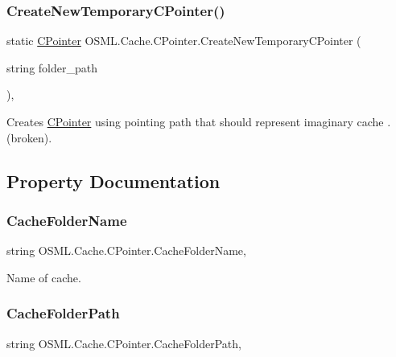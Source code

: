 \subsubsection{\texorpdfstring{CreateNewTemporaryCPointer()}{CreateNewTemporaryCPointer()}}
{\footnotesize\ttfamily static \mbox{\hyperlink{classOSML_1_1Cache_1_1CPointer}{C\+Pointer}} O\+S\+M\+L.\+Cache.\+C\+Pointer.\+Create\+New\+Temporary\+C\+Pointer (\begin{DoxyParamCaption}\item[{string}]{folder\+\_\+path }\end{DoxyParamCaption})\hspace{0.3cm}{\ttfamily [inline]}, {\ttfamily [static]}}



Creates \mbox{\hyperlink{classOSML_1_1Cache_1_1CPointer}{C\+Pointer}} using pointing path that should represent imaginary cache . (broken). 



\subsection{Property Documentation}
\mbox{\label{classOSML_1_1Cache_1_1CPointer_a725810a1cdac6f0c5e94fa248dbe5a82}} 
\subsubsection{\texorpdfstring{CacheFolderName}{CacheFolderName}}
{\footnotesize\ttfamily string O\+S\+M\+L.\+Cache.\+C\+Pointer.\+Cache\+Folder\+Name\hspace{0.3cm}{\ttfamily [get]}, {\ttfamily [set]}}



Name of cache. 

\mbox{\label{classOSML_1_1Cache_1_1CPointer_a179249a806f093356202c2f5bf1220bb}} 
\subsubsection{\texorpdfstring{CacheFolderPath}{CacheFolderPath}}
{\footnotesize\ttfamily string O\+S\+M\+L.\+Cache.\+C\+Pointer.\+Cache\+Folder\+Path\hspace{0.3cm}{\ttfamily [get]}, {\ttfamily [set]}}



